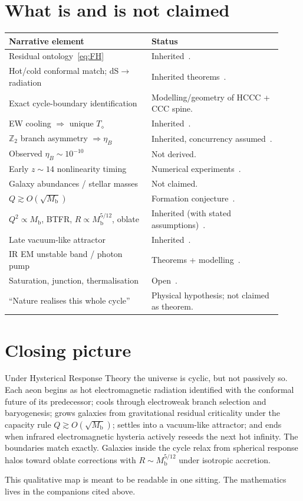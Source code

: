 \documentclass[11pt]{article}
\newcommand{\Mb}{M_{\mathrm{b}}}
\newcommand{\Td}{T_{\diamond}}
\begin{document}
\section{What is and is not claimed}
\label{sec:status}
\begin{center}
\small
\begin{tabular}{@{}p{0.48\linewidth}p{0.44\linewidth}@{}}
\toprule
\textbf{Narrative element} & \textbf{Status}\\
\midrule
Residual ontology~\eqref{eq:FH} & Inherited~\cite{boyd2026response}.\\
Hot/cold conformal match; dS$\to$radiation & Inherited theorems~\cite{boyd2026ccc}.\\
Exact cycle-boundary identification & Modelling/geometry of HCCC + CCC spine.\\
EW cooling $\Rightarrow$ unique $\Td$ & Inherited~\cite{boyd2026cooling}.\\
$\mathbb Z_2$ branch asymmetry $\Rightarrow\eta_B$ & Inherited, concurrency assumed~\cite{boyd2026branch,boyd2026cooling}.\\
Observed $\eta_B\sim10^{-10}$ & Not derived.\\
Early $z\sim14$ nonlinearity timing & Numerical experiments~\cite{boyd2026early}.\\
Galaxy abundances / stellar masses & Not claimed.\\
$Q\gtrsim O(\sqrt{\Mb})$ & Formation conjecture~\cite{boyd2026galactic}.\\
$Q^{2}\propto\Mb$, BTFR, $R\propto\Mb^{5/12}$, oblate & Inherited (with stated assumptions)~\cite{boyd2026galactic}.\\
Late vacuum-like attractor & Inherited~\cite{boyd2026late}.\\
IR EM unstable band / photon pump & Theorems + modelling~\cite{boyd2026ccc}.\\
Saturation, junction, thermalisation & Open~\cite{boyd2026ccc}.\\
``Nature realises this whole cycle'' & Physical hypothesis; not claimed as theorem.\\
\bottomrule
\end{tabular}
\end{center}

\section{Closing picture}
\label{sec:close}
Under Hysterical Response Theory the universe is cyclic, but not passively so.
Each aeon begins as hot electromagnetic radiation identified with the conformal
future of its predecessor; cools through electroweak branch selection and
baryogenesis; grows galaxies from gravitational residual criticality under the
capacity rule $Q\gtrsim O(\sqrt{\Mb})$; settles into a vacuum-like attractor; and
ends when infrared electromagnetic hysteria actively reseeds the next hot infinity.
The boundaries match exactly.
Galaxies inside the cycle relax from spherical response halos toward oblate
corrections with $R\sim\Mb^{5/12}$ under isotropic accretion.

This qualitative map is meant to be readable in one sitting.
The mathematics lives in the companions cited above.



\end{document}
